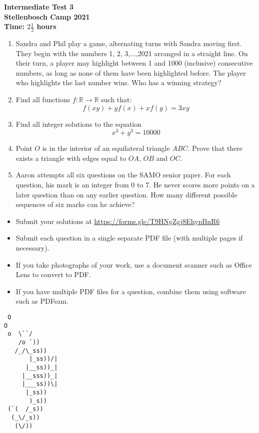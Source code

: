 \documentclass{article}
\begin{document}
\thispagestyle{empty}

\begin{center}
  \textbf{\Large Intermediate Test 3}
  \\ \vspace{1em}
  \textbf{\large Stellenbosch Camp 2021}
  \\ \vspace{1em}
  \textbf{\large Time: $2\frac{1}{2}$ hours}
\end{center}

\bigskip

\begin{enumerate}[itemsep=\fill]

\item %
Sandra and Phil play a game, alternating turns with Sandra moving first. They begin with the numbers 1, 2, 3,...,2021 arranged in a straight line. On their turn, a player may highlight between 1 and 1000 (inclusive) consecutive numbers, as long as none of them have been highlighted before. The player who highlights the last number wins. Who has a winning strategy?

\item %
Find all functions $f: \mathbb{R} \rightarrow \mathbb{R}$ such that:
$$f(xy) + yf(x) + xf(y) = 3xy$$

\item %
Find all integer solutions to the equation $$ x^3+y^3=10 000$$

\item %
Point $O$ is in the interior of an equilateral triangle $ABC$. Prove that there exists a triangle with edges equal to $OA$, $OB$ and $OC$.

\item %
Aaron attempts all six questions on the SAMO senior paper. For each question, his mark is an integer from 0 to 7. He never scores more points on a later question than on any earlier question. How many different possible sequences of six marks can he achieve? 
\end{enumerate}


\vfill
\begin{itemize}
	\item Submit your solutions at \href{https://forms.gle/T9HNgZgj8EhypBnR6}{https://forms.gle/T9HNgZgj8EhypBnR6}
	\item Submit each question in a single separate PDF file (with multiple pages if necessary).
	\item If you take photographs of your work, use a document scanner such as Office Lens to convert to PDF.
	\item If you have multiple PDF files for a question, combine them using software such as PDFsam.
\end{itemize}

\vfill
\centering
\begin{BVerbatim}
 O
O
 o  \``/
    /o `))
   /_/\_ss))
       |_ss))/|
      |__ss))_|
     |__sss))_|
     |___ss))\|
      |_ss))
       )_s))
 (`(  /_s))
  (_\/_s))
   (\/))
\end{BVerbatim}
\end{document}
